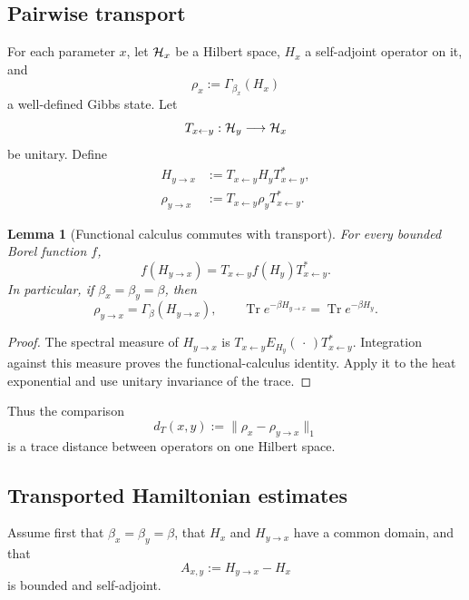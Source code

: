 \documentclass[11pt]{article}
\newtheorem{lemma}[theorem]{Lemma}
\theoremstyle{remark}
\begin{document}
\subsection{Pairwise transport}

For each parameter \(x\), let \({\cal H}_x\) be a Hilbert space,
\(H_x\) a self-adjoint operator on it, and
\[
 \rho_x:=\Gamma_{\beta_x}(H_x)
\]
a well-defined Gibbs state.  Let
\[
 T_{x\leftarrow y}:{\cal H}_y\longrightarrow{\cal H}_x
\]
be unitary.  Define
\begin{align}
 H_{y\to x}
 &:=
 T_{x\leftarrow y}H_yT_{x\leftarrow y}^*,        \tag{61.1}\\
 \rho_{y\to x}
 &:=
 T_{x\leftarrow y}\rho_yT_{x\leftarrow y}^*.     \tag{61.2}
\end{align}

\begin{lemma}[Functional calculus commutes with transport]
\label{lem:v12v61-functional}
For every bounded Borel function \(f\),
\[
 f(H_{y\to x})
 =
 T_{x\leftarrow y}f(H_y)T_{x\leftarrow y}^*.
\]
In particular, if \(\beta_x=\beta_y=\beta\), then
\begin{equation}
 \rho_{y\to x}=\Gamma_\beta(H_{y\to x}),\qquad
 \operatorname{Tr}e^{-\beta H_{y\to x}}
 =
 \operatorname{Tr}e^{-\beta H_y}.                 \tag{61.3}
\end{equation}
\end{lemma}

\begin{proof}
The spectral measure of \(H_{y\to x}\) is
\(T_{x\leftarrow y}E_{H_y}(\,\cdot\,)
T_{x\leftarrow y}^*\).  Integration against this measure proves the
functional-calculus identity.  Apply it to the heat exponential and
use unitary invariance of the trace.
\end{proof}

Thus the comparison
\begin{equation}
 d_T(x,y):=
 \|\rho_x-\rho_{y\to x}\|_1                       \tag{61.4}
\end{equation}
is a trace distance between operators on one Hilbert space.

\subsection{Transported Hamiltonian estimates}

Assume first that \(\beta_x=\beta_y=\beta\), that
\(H_x\) and \(H_{y\to x}\) have a common domain, and that
\begin{equation}
 A_{x,y}:=H_{y\to x}-H_x                          \tag{61.5}
\end{equation}
is bounded and self-adjoint.
\end{document}

